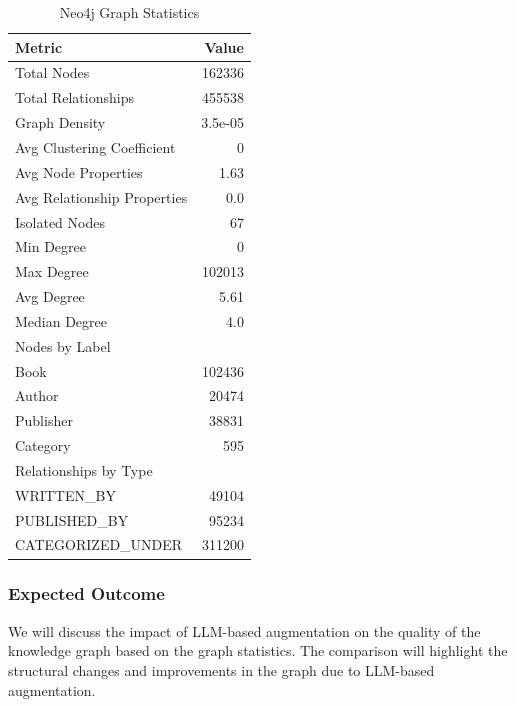 \documentclass{article}
\begin{document}
\begin{table}[h]
      \centering
      \begin{tabular}{|l|r|}
            \hline
            \textbf{Metric}             & \textbf{Value} \\ \hline
            Total Nodes                 & 162336         \\
            Total Relationships         & 455538         \\
            Graph Density               & 3.5e-05        \\
            Avg Clustering Coefficient  & 0              \\
            Avg Node Properties         & 1.63           \\
            Avg Relationship Properties & 0.0            \\
            Isolated Nodes              & 67             \\
            Min Degree                  & 0              \\
            Max Degree                  & 102013         \\
            Avg Degree                  & 5.61           \\
            Median Degree               & 4.0            \\
            \hline
            Nodes by Label              &                \\
            \quad Book                  & 102436         \\
            \quad Author                & 20474          \\
            \quad Publisher             & 38831          \\
            \quad Category              & 595            \\
            \hline
            Relationships by Type       &                \\
            \quad WRITTEN\_BY           & 49104          \\
            \quad PUBLISHED\_BY         & 95234          \\
            \quad CATEGORIZED\_UNDER    & 311200         \\
            \hline
      \end{tabular}
      \caption{Neo4j Graph Statistics}
      \label{tab:neo4j-stats}
\end{table}

\subsubsection{Expected Outcome}
We will discuss the impact of LLM-based augmentation on the quality of the
knowledge graph based on the graph statistics. The comparison will highlight
the structural changes and improvements in the graph due to LLM-based
augmentation.
\end{document}
